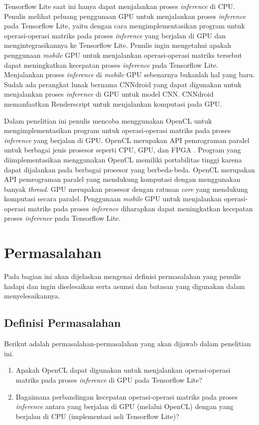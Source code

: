 Tensorflow Lite saat ini hanya dapat menjalankan proses \textit{inference} di CPU. Penulis melihat peluang penggunaan GPU untuk menjalankan proses \textit{inference} pada Tensorflow Lite, yaitu dengan cara mengimplementasikan program untuk operasi-operasi matriks pada proses \textit{inference} yang berjalan di GPU dan mengintegrasikannya ke Tensorflow Lite. Penulis ingin mengetahui apakah penggunaan \textit{mobile} GPU untuk menjalankan operasi-operasi matriks tersebut dapat meningkatkan kecepatan proses \textit{inference} pada Tensorflow Lite. Menjalankan proses \textit{inference} di \textit{mobile} GPU sebenarnya bukanlah hal yang baru. Sudah ada perangkat lunak bernama CNNdroid \cite{cnndroid} yang dapat digunakan untuk menjalankan proses \textit{inference} di GPU untuk model CNN. CNNdroid memanfaatkan Renderscript untuk menjalankan komputasi pada GPU.

Dalam penelitian ini penulis mencoba menggunakan OpenCL \cite{openclori} untuk mengimplementasikan program untuk operasi-operasi matriks pada proses \textit{inference} yang berjalan di GPU. OpenCL merupakan API pemrograman paralel untuk berbagai jenis prosesor seperti CPU, GPU, dan FPGA \cite{opencl}. Program yang diimplementasikan menggunakan OpenCL memiliki portabilitas tinggi karena dapat dijalankan pada berbagai prosesor yang berbeda-beda. OpenCL merupakan API pemrograman paralel yang mendukung komputasi dengan menggunakan banyak \textit{thread}. GPU merupakan prosesor dengan ratusan \textit{core} yang mendukung komputasi secara paralel. Penggunaan \textit{mobile} GPU untuk menjalankan operasi-operasi matriks pada proses \textit{inference} diharapkan dapat meningkatkan kecepatan proses \textit{inference} pada Tensorflow Lite.

\section{Permasalahan}
Pada bagian ini akan dijelaskan mengenai definisi permasalahan 
yang penulis hadapi dan ingin diselesaikan serta asumsi dan batasan yang digunakan dalam menyelesaikannya.
\subsection{Definisi Permasalahan}
Berikut adalah permasalahan-permasalahan yang akan dijawab dalam penelitian ini.
\begin{enumerate}
\item Apakah OpenCL dapat digunakan untuk menjalankan operasi-operasi matriks pada proses \textit{inference} di GPU pada Tensorflow Lite?
\item Bagaimana perbandingan kecepatan operasi-operasi matriks pada proses \textit{inference} antara yang berjalan di GPU (melalui OpenCL) dengan yang berjalan di CPU (implementasi asli Tensorflow Lite)?
\end{enumerate}

